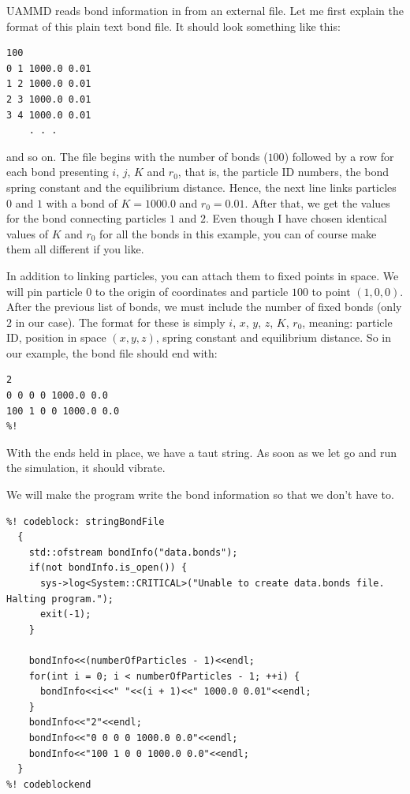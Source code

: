 UAMMD reads bond information in from an external file. Let me first explain the
format of this plain text bond file. It should look something like this:
\begin{lstlisting}
100
0 1 1000.0 0.01
1 2 1000.0 0.01
2 3 1000.0 0.01
3 4 1000.0 0.01
    . . .
\end{lstlisting}
and so on. The file begins with the number of bonds ($100$) followed by a row
for each bond presenting $i$, $j$, $K$ and $r_0$, that is, the particle ID
numbers, the bond spring constant and the equilibrium distance. Hence, the next
line links particles $0$ and $1$ with a bond of $K = 1000.0$ and $r_0 = 0.01$.
After that, we get the values for the bond connecting particles $1$ and $2$.
Even though I have chosen identical values of $K$ and $r_0$ for all the bonds in
this example, you can of course make them all different if you like.

In addition to linking particles, you can attach them to fixed points in space.
We will pin particle $0$ to the origin of coordinates and particle $100$ to
point $(1, 0, 0)$. After the previous list of bonds, we must include the number
of fixed bonds (only $2$ in our case). The format for these is simply $i$, $x$,
$y$, $z$, $K$, $r_0$, meaning: particle ID, position in space $(x, y, z)$,
spring constant and equilibrium distance. So in our example, the bond file
should end with:
\begin{lstlisting}
2
0 0 0 0 1000.0 0.0
100 1 0 0 1000.0 0.0
%!
\end{lstlisting}
With the ends held in place, we have a taut string. As soon as we let go and run
the simulation, it should vibrate.

We will make the program write the bond information so that we don't have to.
\begin{lstlisting}
%! codeblock: stringBondFile
  {
    std::ofstream bondInfo("data.bonds");
    if(not bondInfo.is_open()) {
      sys->log<System::CRITICAL>("Unable to create data.bonds file. Halting program.");
      exit(-1);
    }

    bondInfo<<(numberOfParticles - 1)<<endl;
    for(int i = 0; i < numberOfParticles - 1; ++i) {
      bondInfo<<i<<" "<<(i + 1)<<" 1000.0 0.01"<<endl;
    }
    bondInfo<<"2"<<endl;
    bondInfo<<"0 0 0 0 1000.0 0.0"<<endl;
    bondInfo<<"100 1 0 0 1000.0 0.0"<<endl;
  }
%! codeblockend
\end{lstlisting}

